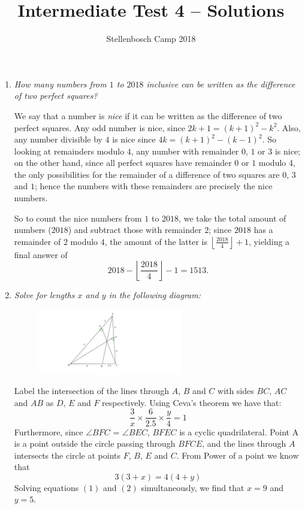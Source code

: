 \documentclass{article}
\title{Intermediate Test 4 -- Solutions}
\author{Stellenbosch Camp 2018}
\date{\vspace{-12pt}}
\newcommand{\floor}[1]{\ensuremath{\left\lfloor#1\right\rfloor}}
\begin{document}
\maketitle

\begin{enumerate}[1.]

\item %
\textit{How many numbers from $1$ to $2018$ inclusive can be written as the difference of two perfect squares?}

We say that a number is \emph{nice} if it can be written as the difference of two perfect squares. Any odd number is nice, since $2k+1 = (k+1)^2 -k^2$. Also, any number divisible by $4$ is nice since $4k = (k+1)^2 -(k-1)^2$. So looking at remainders modulo $4$, any number with remainder $0$, $1$ or $3$ is nice; on the other hand, since all perfect squares have remainder $0$ or $1$ modulo 4, the only possibilities for the remainder of a difference of two squares are $0$, $3$ and $1$; hence the numbers with these remainders are precisely the nice numbers.

So to count the nice numbers from $1$ to $2018$, we take the total amount of numbers ($2018$) and subtract those with remainder $2$; since $2018$ has a remainder of $2$ modulo $4$, the amount of the latter is $\floor{\frac{2018}{4}} +1$, yielding a final answer of \[ 2018 - \floor{\frac{2018}{4}} -1 = 1513. \]


\vspace{12pt}
\item %
\textit{Solve for lengths $x$ and $y$ in the following diagram:}

\begin{figure}[h]
\centering
\includegraphics[width=0.6\textwidth]{GeogebraTest4sol.png}
\end{figure}

Label the intersection of the lines through $A$, $B$ and $C$ with sides $BC$, $AC$ and $AB$ as $D$, $E$ and $F$ respectively.
Using Ceva's theorem we have that: 
\begin{equation}
\frac{3}{x} \times \frac{6}{2.5} \times \frac{y}{4} = 1
\end{equation}
Furthermore, since $\angle BFC$ = $\angle BEC$, $BFEC$ is a cyclic quadrilateral. Point A is a point outside the circle passing through $BFCE$, and the lines through $A$ intersects the circle at points $F$, $B$, $E$ and $C$. From Power of a point we know that
\begin{equation}
3(3+x) = 4(4+y)
\end{equation}
Solving equations $(1)$ and $(2)$ simultaneously, we find that $x = 9$ and $y = 5$.


\end{enumerate}
\end{document}
